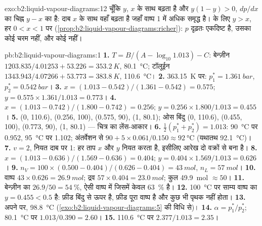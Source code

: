 \begin{solution}{exo:b2:liquid-vapour-diagrams:12}
चूँकि $y$, $x$ के साथ बढ़ता है और $y(1 - y) > 0$, $dp/dx$ का चिह्न $y - x$ का है:
दाब $x$ के साथ वहाँ बढ़ता है जहाँ वाष्प 1 में अधिक समृद्ध है।  के लिए $y > x$, हर $0 < x < 1$ पर (\cref{prop:b2:liquid-vapour-diagrams:richer}):
$p$ दृढ़तः एकदिष्ट है, उसका कोई चरम नहीं, और कोई  नहीं।
\end{solution}

\begin{solution}{pb:b2:liquid-vapour-diagrams:1}
\textbf{1.} $T = B/(A - \log_{10}1.013) - C$: बेन्ज़ीन $1203.835/4.01253 + 53.226 =
\qty{353.2}{K}$, \qty{80.1}{\degreeCelsius}; टॉलूईन $1343.943/4.07266 + 53.773 =
\qty{383.8}{K}$, \qty{110.6}{\degreeCelsius}।
\textbf{2.} \qty{363.15}{K} पर: $p_1^* = \qty{1.361}{bar}$, $p_2^* = \qty{0.542}{bar}$।
\textbf{3.} $x = (1.013 - 0.542)/(1.361 - 0.542) = 0.575$; $y = 0.575 \times
1.361/1.013 = 0.773$।
\textbf{4.} $x = (1.013 - 0.742)/(1.800 - 0.742) = 0.256$; $y = 0.256 \times
1.800/1.013 = 0.455$।
\textbf{5.}  (0, 110.6), (0.256, 100), (0.575, 90), (1, 80.1); ओस
बिंदु (0, 110.6), (0.455, 100), (0.773, 90), (1, 80.1) --- चित्र का
लेंस-आकार।
\textbf{6.} $\frac12(p_1^* + p_2^*) = 1.013$: \qty{90}{\degreeCelsius} पर 0.952,
\qty{95}{\degreeCelsius} पर 1.102; अंतर्वेशन से $90 + 5 \times 0.061/0.150 \approx
\qty{92}{\degreeCelsius}$ (यथातथ \qty{92.1}{\degreeCelsius})।
\textbf{7.} $v = 2$, नियत दाब पर 1: हर ताप $x$ और $y$ नियत करता है,
इसीलिए आरेख दो वक्रों से बना है।
\textbf{8.} $x = (1.013 - 0.636)/(1.569 - 0.636) = 0.404$; $y = 0.404 \times
1.569/1.013 = 0.626$।
\textbf{9.} $n_V = 100 \times (0.500 - 0.404)/(0.626 - 0.404) = \qty{43}{mol}$,
$n_L = \qty{57}{mol}$।
\textbf{10.} वाष्प $43 \times 0.626 = \qty{26.9}{mol}$; द्रव $57 \times 0.404
= \qty{23.0}{mol}$; कुल \qty{49.9}{mol} $\approx 50$।
\textbf{11.} बेन्ज़ीन का $26.9/50 = 54~\%$, ऐसी वाष्प में जिसमें केवल 63~\% है।
\textbf{12.} \qty{100}{\degreeCelsius} पर साम्य वाष्प का $y =
0.455 < 0.5$ है: फ़ीड बिंदु  से ऊपर है, फ़ीड पूरा
वाष्प है और कुछ भी पृथक नहीं होता।
\textbf{13.} अपने  पर, \qty{98.8}{\degreeCelsius} (\cref{exo:b2:liquid-vapour-diagrams:5} की
विधि से)।
\textbf{14.} $\alpha = p_1^*/p_2^*$; \qty{80.1}{\degreeCelsius} पर $1.013/0.390 =
2.60$।
\textbf{15.} \qty{110.6}{\degreeCelsius} पर $2.377/1.013 = 2.35$।

\end{solution}
